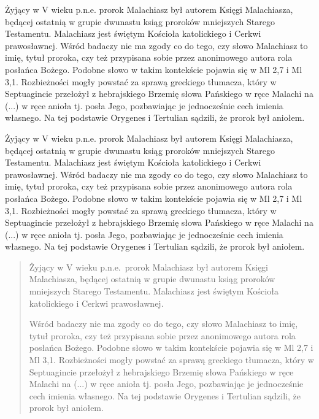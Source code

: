 \documentclass[12pt,a4paper]{article}
\begin{document}
\begin{center}
Żyjący w V wieku p.n.e. prorok Malachiasz był autorem Księgi Malachiasza, będącej
ostatnią w grupie dwunastu ksiąg proroków mniejszych Starego Testamentu. Malachiasz jest
świętym Kościoła katolickiego i Cerkwi prawosławnej. Wśród badaczy nie ma zgody co do
tego, czy słowo Malachiasz to imię, tytuł proroka, czy też przypisana sobie przez
anonimowego autora rola posłańca Bożego. Podobne słowo w takim kontekście pojawia
się w Ml 2,7 i Ml 3,1. Rozbieżności mogły powstać za sprawą greckiego tłumacza, który
w Septuagincie przełożył z hebrajskiego Brzemię słowa Pańskiego w ręce Malachi na
(...) w ręce anioła tj. posła Jego, pozbawiając je jednocześnie cech
imienia własnego. Na tej podstawie Orygenes i Tertulian sądzili, że prorok był aniołem.
\end{center}

\begin{flushleft}
Żyjący w V wieku p.n.e. prorok Malachiasz był autorem Księgi Malachiasza, będącej
ostatnią w grupie dwunastu ksiąg proroków mniejszych Starego Testamentu. Malachiasz jest
świętym Kościoła katolickiego i Cerkwi prawosławnej. Wśród badaczy nie ma zgody co do
tego, czy słowo Malachiasz to imię, tytuł proroka, czy też przypisana sobie przez
anonimowego autora rola posłańca Bożego. Podobne słowo w takim kontekście pojawia
się w Ml 2,7 i Ml 3,1. Rozbieżności mogły powstać za sprawą greckiego tłumacza, który
w Septuagincie przełożył z hebrajskiego Brzemię słowa Pańskiego w ręce Malachi na
(...) w ręce anioła tj. posła Jego, pozbawiając je jednocześnie cech
imienia własnego. Na tej podstawie Orygenes i Tertulian sądzili, że prorok był aniołem.
\end{flushleft}

\begin{quote}
Żyjący w V wieku p.n.e.~prorok Malachiasz był autorem Księgi Malachiasza, będącej
ostatnią w grupie dwunastu ksiąg proroków mniejszych Starego Testamentu. Malachiasz jest
świętym Kościoła katolickiego i Cerkwi prawosławnej.

Wśród badaczy nie ma zgody co do
tego, czy słowo Malachiasz to imię, tytuł proroka, czy też przypisana sobie przez
anonimowego autora rola posłańca Bożego. Podobne słowo w takim kontekście pojawia
się w Ml 2,7 i Ml 3,1. Rozbieżności mogły powstać za sprawą greckiego tłumacza, który
w Septuagincie przełożył z hebrajskiego Brzemię słowa Pańskiego w ręce Malachi na
(...) w ręce anioła tj. posła Jego, pozbawiając je jednocześnie cech
imienia własnego. Na tej podstawie Orygenes i Tertulian sądzili, że prorok był aniołem.
\end{quote}
\end{document}
